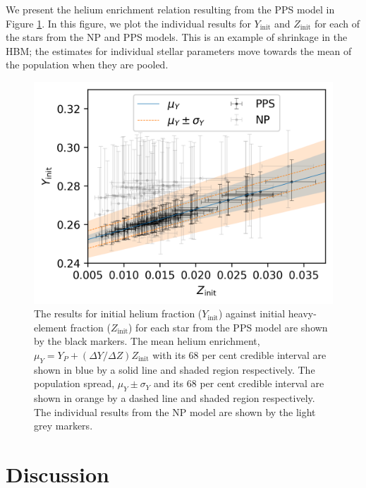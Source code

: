 \documentclass[fleqn,usenatbib]{mnras}
\begin{document}
We present the helium enrichment relation resulting from the PPS model in Figure \ref{fig:helium}. In this figure, we plot the individual results for $Y_\mathrm{init}$ and $Z_\mathrm{init}$ for each of the stars from the NP and PPS models. This is an example of shrinkage in the HBM; the estimates for individual stellar parameters move towards the mean of the population when they are pooled.

\begin{figure}
    \centering
    \includegraphics[width=\linewidth]{figures/zi_yi_results_plot.png}
    \caption{The results for initial helium fraction ($Y_\mathrm{init}$) against initial heavy-element fraction ($Z_\mathrm{init}$) for each star from the PPS model are shown by the black markers. The mean helium enrichment, $\mu_Y = Y_P + (\Delta Y / \Delta Z) Z_\mathrm{init}$ with its 68 per cent credible interval are shown in blue by a solid line and shaded region respectively. The population spread, $\mu_Y \pm \sigma_Y$ and its 68 per cent credible interval are shown in orange by a dashed line and shaded region respectively. The individual results from the NP model are shown by the light grey markers.}
    \label{fig:helium}
\end{figure}

\section{Discussion}\label{sec:dis}


\end{document}
